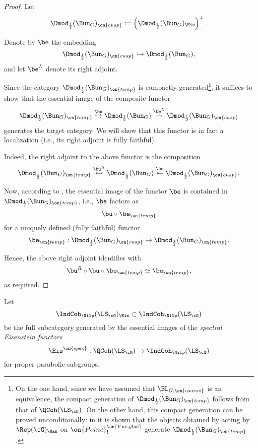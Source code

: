 \documentclass[9pt]{amsart}
\theoremstyle{remark}
\theoremstyle{definition}
\theoremstyle{remark}
\numberwithin{equation}{section}
\begin{document}
\begin{proof} 

Let 
$$\Dmod_{\frac{1}{2}}(\Bun_G)_{\on{cusp}}:=\left(\Dmod_{\frac{1}{2}}(\Bun_G)_{\Eis}\right)^\perp.$$

Denote by $\be$ the embedding
$$\Dmod_{\frac{1}{2}}(\Bun_G)_{\on{cusp}}\hookrightarrow \Dmod_{\frac{1}{2}}(\Bun_G),$$
and let $\be^L$ denote its right adjoint. 

\medskip

Since the category $\Dmod_{\frac{1}{2}}(\Bun_G)_{\on{temp}}$ is compactly 
generated\footnote{On the one hand, since we have assumed that $\BL_{G,\on{coarse}}$ is an equivalence, 
the compact generation of $\Dmod_{\frac{1}{2}}(\Bun_G)_{\on{temp}}$ follows from that of $\QCoh(\LS_\cG)$.
On the other hand, this compact generation can be proved
unconditionally: in \cite{FR} it is shown that
the objects obtained by acting by $\Rep(\cG)_\Ran$ on $\on{Poinc}^{\on{Vac,glob}}_!$ generate
$\Dmod_{\frac{1}{2}}(\Bun_G)_{\on{temp}}$.}, it suffices to show that the essential image of the composite functor
$$\Dmod_{\frac{1}{2}}(\Bun_G)_{\on{temp}}\overset{\bu}\hookrightarrow 
\Dmod_{\frac{1}{2}}(\Bun_G) \overset{\be^L}\twoheadrightarrow \Dmod_{\frac{1}{2}}(\Bun_G)_{\on{cusp}}$$
generates the target category. We will show that this functor is in fact a localization (i.e., its right adjoint is fully faithful). 

\medskip

Indeed, the right adjoint to the above functor is the composition
$$\Dmod_{\frac{1}{2}}(\Bun_G)_{\on{temp}}\overset{\bu^R}\hookleftarrow  \Dmod_{\frac{1}{2}}(\Bun_G) 
\overset{\be}\twoheadleftarrow \Dmod_{\frac{1}{2}}(\Bun_G)_{\on{cusp}}.$$

Now, according to \cite[Theorem A]{Be1}, the essential image of the functor $\be$ is contained in 
$\Dmod_{\frac{1}{2}}(\Bun_G)_{\on{temp}}$, i.e., $\be$ factors as
$$\bu\circ \be_{\on{temp}}$$
for a uniquely defined (fully faithful) functor 
$$\be_{\on{temp}}: \Dmod_{\frac{1}{2}}(\Bun_G)_{\on{cusp}}\to \Dmod_{\frac{1}{2}}(\Bun_G)_{\on{temp}}.$$

Hence, the above right adjoint identifies with
$$\bu^R\circ \bu\circ \be_{\on{temp}}\simeq \be_{\on{temp}},$$
as required. 

\end{proof} 

\sssec{}

Let 
$$\IndCoh_\Nilp(\LS_\cG)_{\Eis}\subset \IndCoh_\Nilp(\LS_\cG)$$
be the full subcategory generated by the essential images of the \emph{spectral Eisenstein functors}
$$\Eis^{\on{spec}}:\QCoh(\LS_\cM)\to \IndCoh_\Nilp(\LS_\cG)$$
for proper parabolic subgroups. 
\end{document}
